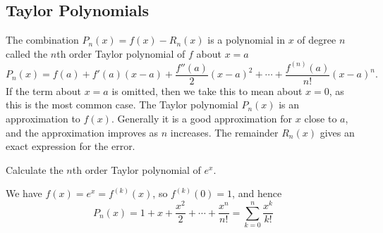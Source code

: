 \documentclass[10pt, a4paper]{article}
\begin{document}
\subsection{Taylor Polynomials}
The combination $P_n(x) = f(x) - R_n(x)$ is a polynomial in $x$ of degree $n$ called the $n$th order Taylor polynomial of $f$ about $x = a$
\[
P_n(x) = f(a) + f'(a)(x - a) + \frac{f''(a)}{2}(x - a) ^ 2 + \dotsi + \frac{f ^ {(n)}(a)}{n!}(x - a) ^ n.
\]
If the term about $x = a$ is omitted,
then we take this to mean about $x = 0$,
as this is the most common case.
The Taylor polynomial $P_n(x)$ is an approximation to $f(x)$.
Generally it is a good approximation for $x$ close to $a$,
and the approximation improves as $n$ increases.
The remainder $R_n(x)$ gives an exact expression for the error.

\begin{example}
    Calculate the $n$th order Taylor polynomial of $e ^ x$.

    We have $f(x) = e ^ x = f ^ {(k)}(x)$,
    so $f ^ {(k)}(0) = 1$,
    and hence
    \[
    P_n(x) = 1 + x + \frac{x ^ 2}{2} + \dotsi + \frac{x ^ n}{n!} = \sum_{k = 0}^{n}\frac{x ^ k}{k!}
    \]
\end{example}
\end{document}
